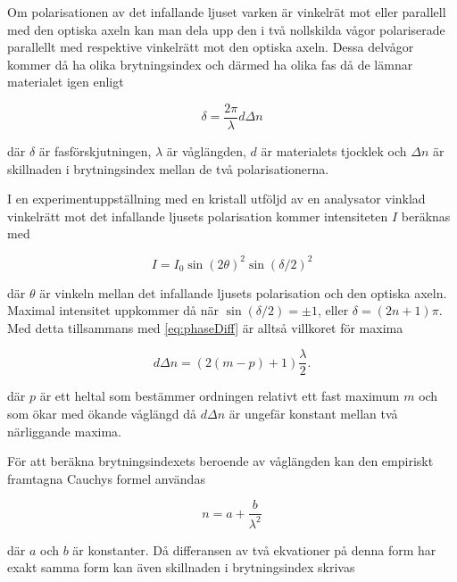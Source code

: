 \documentclass[a4paper]{article}
\begin{document}
Om polarisationen av det infallande ljuset varken är vinkelrät mot eller parallell med den optiska axeln kan man dela upp den i två nollskilda vågor polariserade parallellt med respektive vinkelrätt mot den optiska axeln. Dessa delvågor kommer då ha olika brytningsindex och därmed ha olika fas då de lämnar materialet igen enligt \cite{labManual}

\begin{equation}
	\delta = \frac{2\pi}{\lambda} d \Delta n
	\label{eq:phaseDiff}
\end{equation}

där $\delta$ är fasförskjutningen, $\lambda$ är våglängden, $d$ är materialets tjocklek och $\Delta n$ är skillnaden i brytningsindex mellan de två polarisationerna.

I en experimentuppställning med en kristall utföljd av en analysator vinklad vinkelrätt mot det infallande ljusets polarisation kommer intensiteten $I$ beräknas med \cite{labManual}

\begin{equation}
	I = I_0 \sin\left(2\theta\right)^2 \sin\left(\delta / 2\right)^2
\end{equation}

där $\theta$ är vinkeln mellan det infallande ljusets polarisation och den optiska axeln. Maximal intensitet uppkommer då när $\sin\left(\delta / 2\right) = \pm 1$, eller $\delta = \left(2 n + 1\right)\pi$. \cite{labManual} Med detta tillsammans med \eqref{eq:phaseDiff} är alltså villkoret för maxima

\begin{equation}
	d \Delta n = \left(2 (m - p) + 1\right)\frac{\lambda}{2}\text{.}
	\label{eq:deltaMax}
\end{equation}

där $p$ är ett heltal som bestämmer ordningen relativt ett fast maximum $m$ och som ökar med ökande våglängd då $d \Delta n$ är ungefär konstant mellan två närliggande maxima.

För att beräkna brytningsindexets beroende av våglängden kan den empiriskt framtagna Cauchys formel användas \cite{labManual} \cite[p.~67]{pearsonIntroOpt}

\begin{equation}
	n = a + \frac{b}{\lambda^2}
\end{equation}

där $a$ och $b$ är konstanter. Då differansen av två ekvationer på denna form har exakt samma form kan även skillnaden i brytningsindex skrivas
\end{document}
